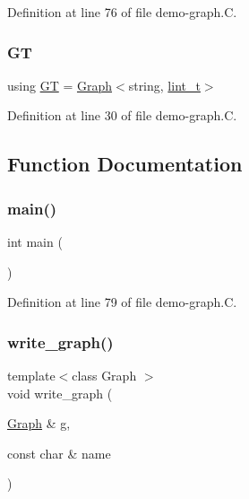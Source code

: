 Definition at line 76 of file demo-\/graph.\+C.

\mbox{\label{demo-graph_8_c_aa29146ba261a2a26fce51cbd8557db3b}} 
\subsubsection{\texorpdfstring{GT}{GT}}
{\footnotesize\ttfamily using \hyperlink{demo-buildgraph_8_c_a3001c40d2c31ca87ed96cd7d1334a55e}{GT} =  \hyperlink{class_designar_1_1_graph}{Graph}$<$string, \hyperlink{namespace_designar_a9d113d66a39e82b73727c72cd3a52f73}{lint\+\_\+t}$>$}



Definition at line 30 of file demo-\/graph.\+C.



\subsection{Function Documentation}
\mbox{\label{demo-graph_8_c_ae66f6b31b5ad750f1fe042a706a4e3d4}} 
\subsubsection{\texorpdfstring{main()}{main()}}
{\footnotesize\ttfamily int main (\begin{DoxyParamCaption}{ }\end{DoxyParamCaption})}



Definition at line 79 of file demo-\/graph.\+C.

\mbox{\label{demo-graph_8_c_a75dee8f1e6289c0fbd2060e643605bfe}} 
\subsubsection{\texorpdfstring{write\+\_\+graph()}{write\_graph()}}
{\footnotesize\ttfamily template$<$class Graph $>$ \\
void write\+\_\+graph (\begin{DoxyParamCaption}\item[{\hyperlink{class_designar_1_1_graph}{Graph} \&}]{g,  }\item[{const char \&}]{name }\end{DoxyParamCaption})}



